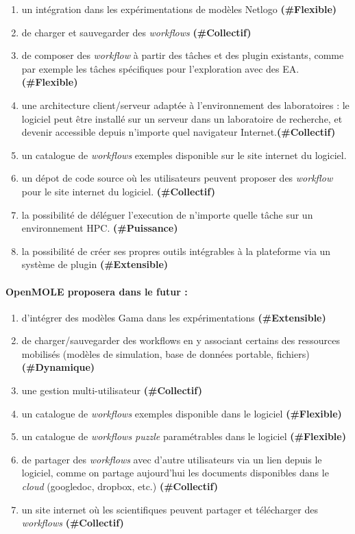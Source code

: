 \begin{enumerate}
\item un intégration dans les expérimentations de modèles Netlogo \textbf{(\#Flexible)}
\item de charger et sauvegarder des \textit{workflows} \textbf{(\#Collectif)}
\item de composer des \textit{workflow} à partir des tâches et des plugin existants, comme par exemple les tâches spécifiques pour l'exploration avec des EA. \textbf{(\#Flexible)}
\item une architecture client/serveur adaptée à l'environnement des laboratoires : le logiciel peut être installé sur un serveur dans un laboratoire de recherche, et devenir accessible depuis n'importe quel navigateur Internet.\textbf{(\#Collectif)}   
\item un catalogue de \textit{workflows} exemples disponible sur le site internet du logiciel.
\item un dépot de code source où les utilisateurs peuvent proposer des \textit{workflow} pour le site internet du logiciel. \textbf{(\#Collectif)}
\item la possibilité de déléguer l'execution de n'importe quelle tâche sur un environnement HPC. \textbf{(\#Puissance)}
\item la possibilité de créer ses propres outils intégrables à la plateforme via un système de plugin \textbf{(\#Extensible)}
\end{enumerate}

\paragraph{OpenMOLE proposera dans le futur :}

\begin{enumerate}
\item d'intégrer des modèles Gama dans les expérimentations \textbf{(\#Extensible)}
\item de charger/sauvegarder des workflows en y associant certains des ressources mobilisés (modèles de simulation, base de données portable, fichiers) \textbf{(\#Dynamique)}
\item une gestion multi-utilisateur \textbf{(\#Collectif)}
\item un catalogue de \textit{workflows} exemples disponible dans le logiciel \textbf{(\#Flexible)}
\item un catalogue de \textit{workflows puzzle} paramétrables dans le logiciel \textbf{(\#Flexible)}
\item de partager des \textit{workflows} avec d'autre utilisateurs via un lien depuis le logiciel, comme on partage aujourd'hui les documents disponibles dans le \textit{cloud} (googledoc, dropbox, etc.)  \textbf{(\#Collectif)}
\item un site internet où les scientifiques peuvent partager et télécharger des \textit{workflows}  \textbf{(\#Collectif)}
\end{enumerate}

